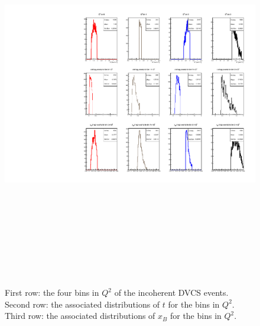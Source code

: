 \begin{figure}[h!]
   \centering
   \includegraphics[height=17.0cm]{4D-incoh-bin/4D-Q2_InCoh_bins.pdf}
   \caption{First row: the four bins in $Q^2$ of the incoherent DVCS events.  
   Second row: the associated distributions of $t$ for the bins in $Q^2$.  
   Third row: the associated distributions of $x_B$ for the bins in $Q^2$.}
\label{fig:incoh_Q2-bins-freep}
\end{figure}

